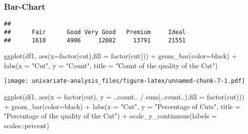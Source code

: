 \documentclass[
]{article}
\newenvironment{Shaded}{\begin{snugshade}}{\end{snugshade}}
\newcommand{\AttributeTok}[1]{\textcolor[rgb]{0.77,0.63,0.00}{#1}}
\newcommand{\FunctionTok}[1]{\textcolor[rgb]{0.00,0.00,0.00}{#1}}
\newcommand{\NormalTok}[1]{#1}
\newcommand{\SpecialCharTok}[1]{\textcolor[rgb]{0.00,0.00,0.00}{#1}}
\newcommand{\StringTok}[1]{\textcolor[rgb]{0.31,0.60,0.02}{#1}}
\begin{document}
\hypertarget{bar-chart}{%
\subsubsection{Bar-Chart}\label{bar-chart}}

\begin{Shaded}
\end{Shaded}

\begin{verbatim}
## 
##      Fair      Good Very Good   Premium     Ideal 
##      1610      4906     12082     13791     21551
\end{verbatim}

\begin{Shaded}
\begin{Highlighting}[]
\FunctionTok{ggplot}\NormalTok{(df1, }\FunctionTok{aes}\NormalTok{(}\AttributeTok{x=}\FunctionTok{factor}\NormalTok{(cut),}\AttributeTok{fill =} \FunctionTok{factor}\NormalTok{(cut))) }\SpecialCharTok{+}
        \FunctionTok{geom\_bar}\NormalTok{(}\AttributeTok{color=}\StringTok{\textquotesingle{}black\textquotesingle{}}\NormalTok{) }\SpecialCharTok{+} 
        \FunctionTok{labs}\NormalTok{(}\AttributeTok{x =} \StringTok{"Cut"}\NormalTok{, }\AttributeTok{y =} \StringTok{"Count"}\NormalTok{, }\AttributeTok{title  =} \StringTok{"Count of the quality of the Cut"}\NormalTok{)}
\end{Highlighting}
\end{Shaded}

\texttt{[image: univariate-analysis\_files/figure-latex/unnamed-chunk-7-1.pdf]}

\begin{Shaded}
\begin{Highlighting}[]
\FunctionTok{ggplot}\NormalTok{(df1, }
       \FunctionTok{aes}\NormalTok{(}\AttributeTok{x =} \FunctionTok{factor}\NormalTok{(cut), }\AttributeTok{y =}\NormalTok{ ..count.. }\SpecialCharTok{/} \FunctionTok{sum}\NormalTok{(..count..),}\AttributeTok{fill =} \FunctionTok{factor}\NormalTok{(cut))) }\SpecialCharTok{+} 
       \FunctionTok{geom\_bar}\NormalTok{(}\AttributeTok{color=}\StringTok{\textquotesingle{}black\textquotesingle{}}\NormalTok{) }\SpecialCharTok{+}
       \FunctionTok{labs}\NormalTok{(}\AttributeTok{x =} \StringTok{"Cut"}\NormalTok{, }\AttributeTok{y =} \StringTok{"Percentage of Cuts"}\NormalTok{, }\AttributeTok{title  =} \StringTok{"Percentage of the quality of the Cut"}\NormalTok{) }\SpecialCharTok{+}
       \FunctionTok{scale\_y\_continuous}\NormalTok{(}\AttributeTok{labels =}\NormalTok{ scales}\SpecialCharTok{::}\NormalTok{percent)}
\end{Highlighting}
\end{Shaded}
\end{document}
